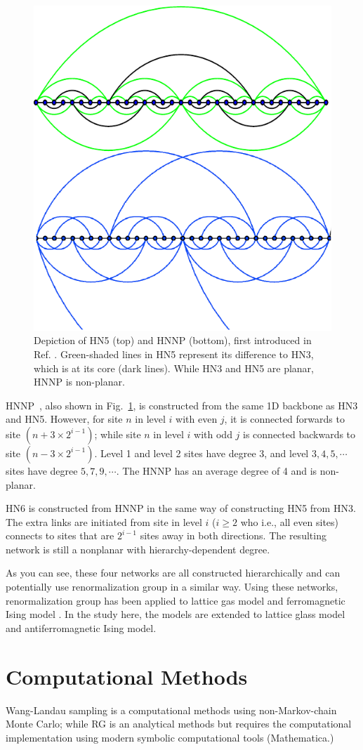 \begin{figure}
\centering\includegraphics[width=0.8\columnwidth]{Chapter-1/HN5HNNP}
\protect\caption{\label{fig:Depiction-of-HN}Depiction of HN5 (top) and HNNP (bottom),
first introduced in Ref. \protect\cite{Boettcher09c}. Green-shaded lines
in HN5 represent its difference to HN3, which is at its core (dark
lines). While HN3 and HN5 are planar, HNNP is non-planar. }
\end{figure}

HNNP~\cite{Boettcher09c}, also shown in Fig.~\ref{fig:Depiction-of-HN},
is constructed from the same 1D backbone as HN3 and HN5. However,
for site $n$ in level $i$ with even $j$, it is connected forwards
to site $(n+3\times2^{i-1})$; while site $n$ in level $i$ with
odd $j$ is connected backwards to site $(n-3\times2^{i-1})$. Level
1 and level 2 sites have degree 3, and level $3,4,5,\cdots$ sites
have degree $5,7,9,\cdots$. The HNNP has an average degree of 4 and
is non-planar.

HN6 \cite{Boettcher09c} is constructed from HNNP in the same way of constructing HN5 from HN3. The extra links are initiated from site in level $i$ ($i\ge2$ who
i.e., all even sites)  connects to sites that are $2^{i-1}$
sites away in both directions. The resulting network is still a nonplanar with hierarchy-dependent degree.

As you can see, these four networks are all constructed hierarchically and can potentially use renormalization group in a similar way. Using these networks, renormalization group has been applied to lattice gas model \cite{cheng2015jamming, BoHa11} and ferromagnetic Ising model \cite{Boettcher2011HNNP, boettcher2015classification}. In the study here, the models are extended to lattice glass model and antiferromagnetic Ising model. 




\section{Computational Methods}

Wang-Landau sampling is a computational methods using non-Markov-chain Monte Carlo; while RG is an analytical methods but requires the computational implementation using modern symbolic computational tools (Mathematica.)
